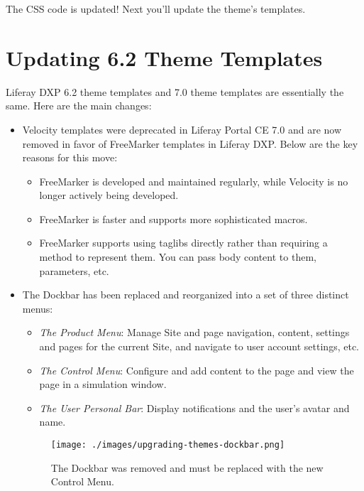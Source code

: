 The CSS code is updated! Next you'll update the theme's templates.

\chapter{Updating 6.2 Theme
Templates}\label{updating-6.2-theme-templates}

Liferay DXP 6.2 theme templates and 7.0 theme templates are essentially
the same. Here are the main changes:

\begin{itemize}
\item
  Velocity templates were deprecated in Liferay Portal CE 7.0 and are
  now removed in favor of FreeMarker templates in Liferay DXP. Below are
  the key reasons for this move:

  \begin{itemize}
  \item
    FreeMarker is developed and maintained regularly, while Velocity is
    no longer actively being developed.
  \item
    FreeMarker is faster and supports more sophisticated macros.
  \item
    FreeMarker supports using taglibs directly rather than requiring a
    method to represent them. You can pass body content to them,
    parameters, etc.
  \end{itemize}
\item
  The Dockbar has been replaced and reorganized into a set of three
  distinct menus:

  \begin{itemize}
  \item
    \emph{The Product Menu}: Manage Site and page navigation, content,
    settings and pages for the current Site, and navigate to user
    account settings, etc.
  \item
    \emph{The Control Menu}: Configure and add content to the page and
    view the page in a simulation window.
  \item
    \emph{The User Personal Bar}: Display notifications and the user's
    avatar and name.
  \end{itemize}

  \begin{figure}
  \centering
  \texttt{[image: ./images/upgrading-themes-dockbar.png]}
  \caption{The Dockbar was removed and must be replaced with the new
  Control Menu.}
  \end{figure}
\end{itemize}

